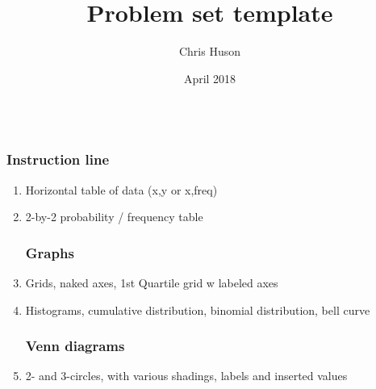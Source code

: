 \documentclass[12pt, oneside]{article}
\title{Problem set template}
\author{Chris Huson}
\date{April 2018}
\begin{document}
\subsubsection*{\\ \textnormal{Instruction line}}

\begin{enumerate}
\subsubsection*{Tables}
\item Horizontal table of data (x,y or x,freq)
\item 2-by-2 probability / frequency table

\subsubsection*{Graphs}
\item Grids, naked axes, 1st Quartile grid w labeled axes
\item Histograms, cumulative distribution, binomial distribution, bell curve

\subsubsection*{Venn diagrams}
\item 2- and 3-circles, with various shadings, labels and inserted values


\end{enumerate}
\end{document}
